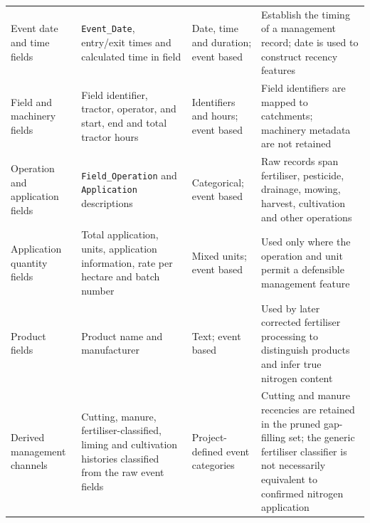 {\begin{longtable}{p{3.2cm}p{4.2cm}p{2.5cm}p{4.6cm}}
Event date and time fields & \texttt{Event\_Date}, entry/exit times and calculated time in field & Date, time and duration; event based & Establish the timing of a management record; date is used to construct recency features \\
Field and machinery fields & Field identifier, tractor, operator, and start, end and total tractor hours & Identifiers and hours; event based & Field identifiers are mapped to catchments; machinery metadata are not retained \\
Operation and application fields & \texttt{Field\_Operation} and \texttt{Application} descriptions & Categorical; event based & Raw records span fertiliser, pesticide, drainage, mowing, harvest, cultivation and other operations \\
Application quantity fields & Total application, units, application information, rate per hectare and batch number & Mixed units; event based & Used only where the operation and unit permit a defensible management feature \\
Product fields & Product name and manufacturer & Text; event based & Used by later corrected fertiliser processing to distinguish products and infer true nitrogen content \\
Derived management channels & Cutting, manure, fertiliser-classified, liming and cultivation histories classified from the raw event fields & Project-defined event categories & Cutting and manure recencies are retained in the pruned gap-filling set; the generic fertiliser classifier is not necessarily equivalent to confirmed nitrogen application \\
\end{longtable}
}
\fi

